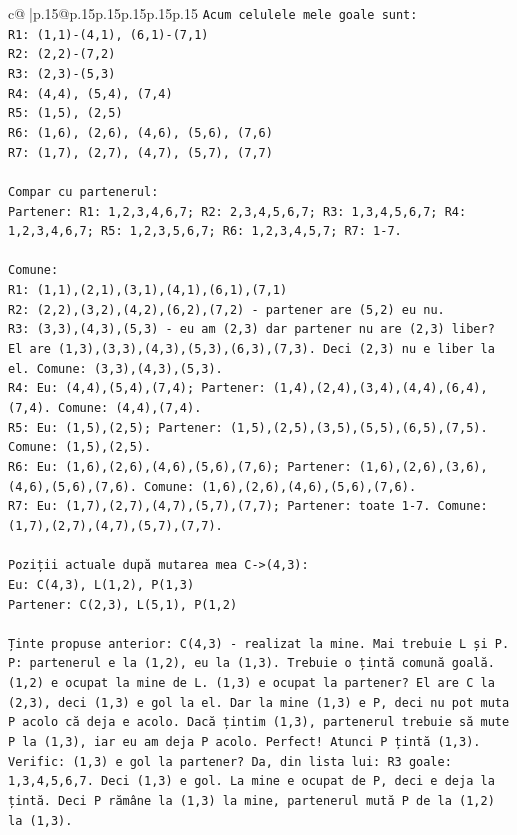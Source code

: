 \documentclass{article}
\begin{document}
{\begin{supertabular}{c@{$\;$}|p{.15\linewidth}@{}p{.15\linewidth}p{.15\linewidth}p{.15\linewidth}p{.15\linewidth}p{.15\linewidth}}
{{{\texttt{Acum celulele mele goale sunt:} \\
\texttt{R1: (1,1){-}(4,1), (6,1){-}(7,1)} \\
\texttt{R2: (2,2){-}(7,2)} \\
\texttt{R3: (2,3){-}(5,3)} \\
\texttt{R4: (4,4), (5,4), (7,4)} \\
\texttt{R5: (1,5), (2,5)} \\
\texttt{R6: (1,6), (2,6), (4,6), (5,6), (7,6)} \\
\texttt{R7: (1,7), (2,7), (4,7), (5,7), (7,7)} \\
\\ 
\texttt{Compar cu partenerul:} \\
\texttt{Partener: R1: 1,2,3,4,6,7; R2: 2,3,4,5,6,7; R3: 1,3,4,5,6,7; R4: 1,2,3,4,6,7; R5: 1,2,3,5,6,7; R6: 1,2,3,4,5,7; R7: 1{-}7.} \\
\\ 
\texttt{Comune:} \\
\texttt{R1: (1,1),(2,1),(3,1),(4,1),(6,1),(7,1)} \\
\texttt{R2: (2,2),(3,2),(4,2),(6,2),(7,2) {-} partener are (5,2) eu nu.} \\
\texttt{R3: (3,3),(4,3),(5,3) {-} eu am (2,3) dar partener nu are (2,3) liber? El are (1,3),(3,3),(4,3),(5,3),(6,3),(7,3). Deci (2,3) nu e liber la el. Comune: (3,3),(4,3),(5,3).} \\
\texttt{R4: Eu: (4,4),(5,4),(7,4); Partener: (1,4),(2,4),(3,4),(4,4),(6,4),(7,4). Comune: (4,4),(7,4).} \\
\texttt{R5: Eu: (1,5),(2,5); Partener: (1,5),(2,5),(3,5),(5,5),(6,5),(7,5). Comune: (1,5),(2,5).} \\
\texttt{R6: Eu: (1,6),(2,6),(4,6),(5,6),(7,6); Partener: (1,6),(2,6),(3,6),(4,6),(5,6),(7,6). Comune: (1,6),(2,6),(4,6),(5,6),(7,6).} \\
\texttt{R7: Eu: (1,7),(2,7),(4,7),(5,7),(7,7); Partener: toate 1{-}7. Comune: (1,7),(2,7),(4,7),(5,7),(7,7).} \\
\\ 
\texttt{Poziții actuale după mutarea mea C{-}>(4,3):} \\
\texttt{Eu: C(4,3), L(1,2), P(1,3)} \\
\texttt{Partener: C(2,3), L(5,1), P(1,2)} \\
\\ 
\texttt{Ținte propuse anterior: C(4,3) {-} realizat la mine. Mai trebuie L și P.} \\
\texttt{P: partenerul e la (1,2), eu la (1,3). Trebuie o țintă comună goală. (1,2) e ocupat la mine de L. (1,3) e ocupat la partener? El are C la (2,3), deci (1,3) e gol la el. Dar la mine (1,3) e P, deci nu pot muta P acolo că deja e acolo. Dacă țintim (1,3), partenerul trebuie să mute P la (1,3), iar eu am deja P acolo. Perfect! Atunci P țintă (1,3). Verific: (1,3) e gol la partener? Da, din lista lui: R3 goale: 1,3,4,5,6,7. Deci (1,3) e gol. La mine e ocupat de P, deci e deja la țintă. Deci P rămâne la (1,3) la mine, partenerul mută P de la (1,2) la (1,3).} \\
}}}
\end{supertabular}}
\end{document}
